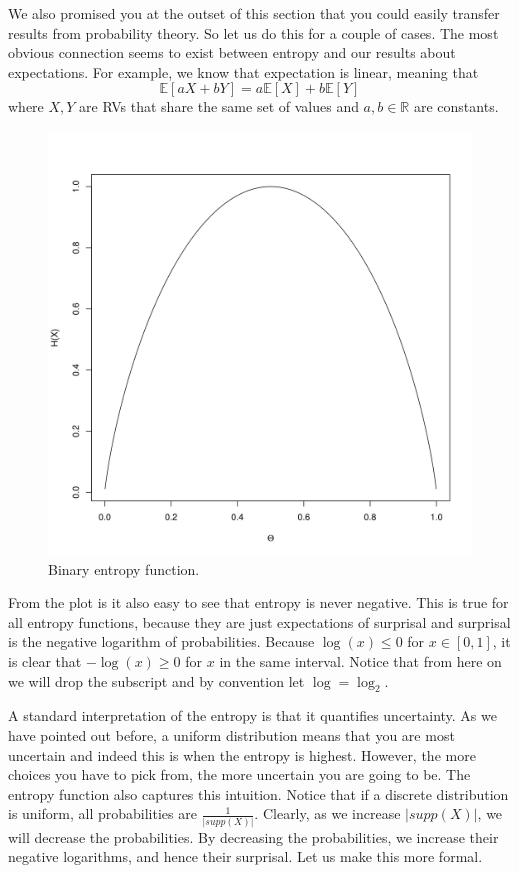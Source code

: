 We also promised you at the outset of this section that you could easily transfer results from probability
theory.  So let us do this for a couple of cases. The most obvious connection seems to exist between
entropy and our results about expectations. For example, we know that expectation is linear, meaning
that
\begin{equation}
\mathbb{E}[aX + bY] = a\mathbb{E}[X] + b\mathbb{E}[Y]
\end{equation}
where $ X,Y $ are RVs that share the same set of values and $ a,b \in \mathbb{R} $ are constants.
\begin{figure}
\center
\includegraphics[scale=0.5]{binaryEntropy.png}
\caption{Binary entropy function.}
\label{fig:binaryEntropy}
\end{figure}

From the plot is it also easy to see that entropy is never negative. This is true for all entropy functions,
because they are just expectations of surprisal and surprisal is the negative logarithm of probabilities. 
Because $ \log(x) \leq 0 $ for $ x \in [0,1] $, it is clear that $ -\log(x) \geq 0 $ for $ x $ in the same
interval. Notice that from here on we will drop the subscript and by convention let $ \log = \log_{2} $.

A standard interpretation of the entropy is that it quantifies uncertainty. As we have pointed out
before, a uniform distribution means that you are most uncertain and indeed this is when the entropy
is highest. However, the more choices you have to pick from, the more uncertain you are going to be. 
The entropy function also captures this intuition. Notice that if a discrete distribution is uniform,
all probabilities are $ \frac{1}{|supp(X)|} $. Clearly, as we increase $ |supp(X)| $, we will decrease the
probabilities. By decreasing the probabilities, we increase their negative logarithms, and hence their
surprisal. Let us make this more formal.

